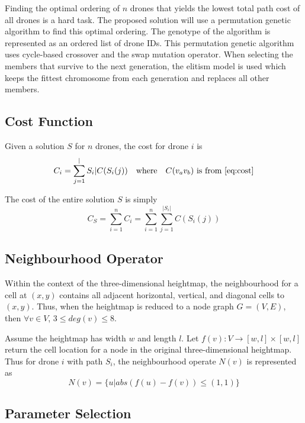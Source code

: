 \documentclass[conference]{IEEEtran}
\begin{document}
Finding the optimal ordering of $n$ drones that yields the lowest total path cost of all drones is a hard task. The proposed solution will use a permutation genetic algorithm to find this optimal ordering. The genotype of the algorithm is represented as an ordered list of drone IDs. This permutation genetic algorithm uses cycle-based crossover and the swap mutation operator. When selecting the members that survive to the next generation, the elitism model is used which keeps the fittest chromosome from each generation and replaces all other members.

\subsection{Cost Function}
Given a solution $S$ for $n$ drones, the cost for drone $i$ is 
\begin{equation} \label{eq:costdrone}
C_i = \sum_{j=1}^|S_i| C(S_i(j)) \quad \text{where} \quad C(v_av_b) \text{ is from \ref{eq:cost}}
\end{equation}

The cost of the entire solution $S$ is simply
\begin{equation} \label{eq:costsolution}
C_S = \sum_{i=1}^n C_i = \sum_{i=1}^n \sum_{j=1}^|S_i| C(S_i(j))
\end{equation}

\subsection{Neighbourhood Operator}
Within the context of the three-dimensional heightmap, the neighbourhood for a cell at $(x, y)$ contains all adjacent horizontal, vertical, and diagonal cells to $(x, y)$. Thus, when the heightmap is reduced to a node graph $G = (V, E)$, then $\forall v \in V$, $3 \leq deg(v) \leq 8$.

Assume the heightmap has width $w$ and length $l$. Let $f(v) : V \rightarrow [w, l] \times [w, l]$ return the cell location for a node in the original three-dimensional heightmap. Thus for drone $i$ with path $S_i$, the neighbourhood operate $N(v)$ is represented as
\begin{equation} \label{eq:neighbourhood}
N(v) = \{ u | abs(f(u) - f(v)) \leq (1, 1) \}
\end{equation}


\subsection{Parameter Selection}
\end{document}
